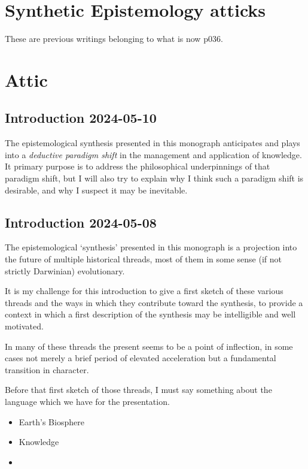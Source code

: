 \documentclass[10pt,titlepage]{book}
\begin{document}
\part{Synthetic Epistemology atticks}

These are previous writings belonging to what is now p036.


\part{Attic}


\chapter{Introduction 2024-05-10}

The epistemological synthesis presented in this monograph anticipates and plays into a \emph{deductive paradigm shift} in the management and application of knowledge.
It primary purpose is to address the philosophical underpinnings of that paradigm shift, but I will also try to explain why I think such a paradigm shift is desirable, and why I suspect it may be inevitable.



\chapter{Introduction 2024-05-08}

The epistemological `synthesis' presented in this monograph is a projection into the future of multiple historical threads, most of them in some sense (if not strictly Darwinian) evolutionary.

It is my challenge for this introduction to give a first sketch of these various threads and the ways in which they contribute toward the synthesis, to provide a context in which a first description of the synthesis may be intelligible and well motivated.

In many of these threads the present seems to be a point of inflection, in some cases not merely a brief period of elevated acceleration
but a fundamental transition in character.

Before that first sketch of those threads, I must say something about the language which we have for the presentation.

\begin{itemize}
\item Earth's Biosphere
\item Knowledge
\item 
  
\end{itemize}
\end{document}
